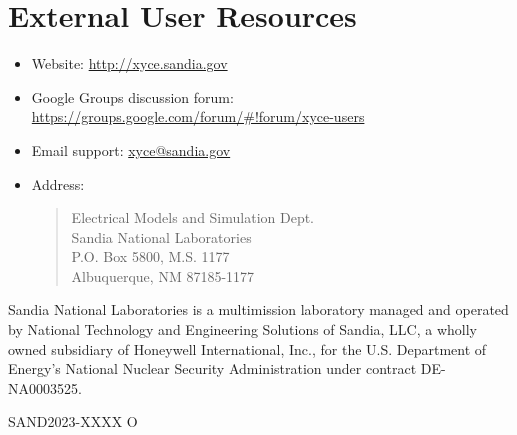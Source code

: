 \documentclass[letterpaper]{scrartcl}
\begin{document}
\section{External User Resources}
\begin{itemize}
  \item Website: {\color{XyceDeepRed}\url{http://xyce.sandia.gov}}
  \item Google Groups discussion forum:
    {\color{XyceDeepRed}\url{https://groups.google.com/forum/#!forum/xyce-users}}
  \item Email support:
    {\color{XyceDeepRed}\href{mailto:xyce@sandia.gov}{xyce@sandia.gov}}
  \item Address:
    \begin{quote}
            Electrical Models and Simulation Dept.\\
            Sandia National Laboratories\\
            P.O. Box 5800, M.S. 1177\\
            Albuquerque, NM 87185-1177 \\
    \end{quote}
\end{itemize}

\vspace*{\fill}
\noindent
Sandia National Laboratories is a multimission laboratory managed and
operated by National Technology and Engineering Solutions of Sandia,
LLC, a wholly owned subsidiary of Honeywell International, Inc., for
the U.S. Department of Energy's National Nuclear Security
Administration under contract DE-NA0003525.

SAND2023-XXXX O
\end{document}
